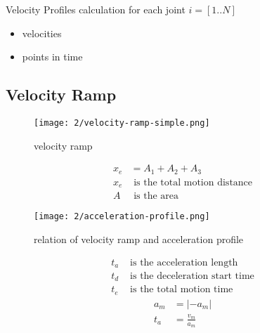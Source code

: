 \documentclass[%
  professionalfonts,%
  xcolor={%
    usenames,%
    dvipsnames,%
    svgnames,%
    table,%
    hyperref%
  }%
]{beamer}
\begin{document}
\begin{frame}{Velocity Profiles}
calculation for each joint $i=[1..N]$
	\begin{itemize}
		\item velocities
		\item points in time
	\end{itemize}

\end{frame}

\subsection{Velocity Ramp}
\begin{frame}
\begin{figure}[h]
  \texttt{[image: 2/velocity-ramp-simple.png]}
  \caption{velocity ramp}
  \label{fig:velocity-profile}
\end{figure}
\begin{align*}
x_{e} & = A_{1} + A_{2} + A_{3} \\
x_{e} & \text{ is the total motion distance} \\
A & \text{ is the area}
\end{align*}
\end{frame}

\begin{frame}
	\begin{figure}[h]
		\texttt{[image: 2/acceleration-profile.png]}
		\caption{relation of velocity ramp and acceleration profile}
		\label{fig:acceleration-profile}
	\end{figure}
		\begin{align*} %
		t_{a} & \text{ is the acceleration length} \\
		t_{d} & \text{ is the deceleration start time} \\
		t_{e} & \text{ is the total motion time}
		\end{align*}
		\begin{align*}
		a_{m} & = \lvert -a_{m} \rvert \\
		t_{a} & = \frac{v_{m}}{a_{m}}
		\end{align*}
\end{frame}
\end{document}
